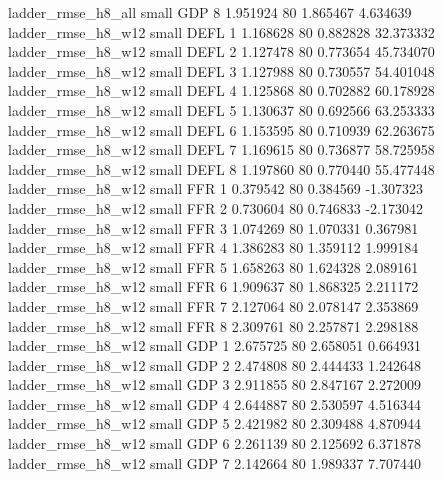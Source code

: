       ladder_rmse_h8_all      small      GDP                 8 1.951924 80       1.865467           4.634639
      ladder_rmse_h8_w12      small     DEFL                 1 1.168628 80       0.882828          32.373332
      ladder_rmse_h8_w12      small     DEFL                 2 1.127478 80       0.773654          45.734070
      ladder_rmse_h8_w12      small     DEFL                 3 1.127988 80       0.730557          54.401048
      ladder_rmse_h8_w12      small     DEFL                 4 1.125868 80       0.702882          60.178928
      ladder_rmse_h8_w12      small     DEFL                 5 1.130637 80       0.692566          63.253333
      ladder_rmse_h8_w12      small     DEFL                 6 1.153595 80       0.710939          62.263675
      ladder_rmse_h8_w12      small     DEFL                 7 1.169615 80       0.736877          58.725958
      ladder_rmse_h8_w12      small     DEFL                 8 1.197860 80       0.770440          55.477448
      ladder_rmse_h8_w12      small      FFR                 1 0.379542 80       0.384569          -1.307323
      ladder_rmse_h8_w12      small      FFR                 2 0.730604 80       0.746833          -2.173042
      ladder_rmse_h8_w12      small      FFR                 3 1.074269 80       1.070331           0.367981
      ladder_rmse_h8_w12      small      FFR                 4 1.386283 80       1.359112           1.999184
      ladder_rmse_h8_w12      small      FFR                 5 1.658263 80       1.624328           2.089161
      ladder_rmse_h8_w12      small      FFR                 6 1.909637 80       1.868325           2.211172
      ladder_rmse_h8_w12      small      FFR                 7 2.127064 80       2.078147           2.353869
      ladder_rmse_h8_w12      small      FFR                 8 2.309761 80       2.257871           2.298188
      ladder_rmse_h8_w12      small      GDP                 1 2.675725 80       2.658051           0.664931
      ladder_rmse_h8_w12      small      GDP                 2 2.474808 80       2.444433           1.242648
      ladder_rmse_h8_w12      small      GDP                 3 2.911855 80       2.847167           2.272009
      ladder_rmse_h8_w12      small      GDP                 4 2.644887 80       2.530597           4.516344
      ladder_rmse_h8_w12      small      GDP                 5 2.421982 80       2.309488           4.870944
      ladder_rmse_h8_w12      small      GDP                 6 2.261139 80       2.125692           6.371878
      ladder_rmse_h8_w12      small      GDP                 7 2.142664 80       1.989337           7.707440
